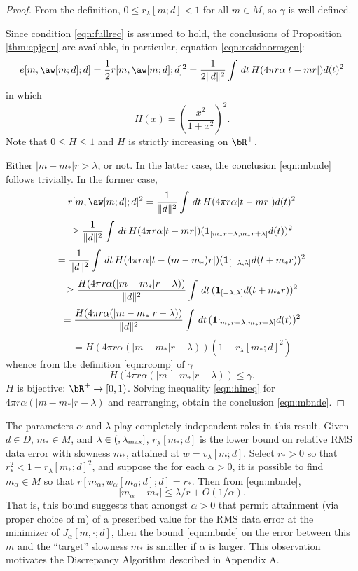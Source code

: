 \begin{proof}
From the definition, $0 \le r_{\lambda}[m;d] < 1 $ for all $m \in M$, so $\gamma$ is well-defined.

Since condition \ref{eqn:fullrec} is assumed to hold, the conclusions of Proposition \ref{thm:epjgen} are available, in particular, equation \ref{eqn:residnormgen}:
  \[
  e[m,\aw[m;d];d] = \frac{1}{2}r[m,\aw[m;d];d]^2 = \frac{1}{2\|d\|^2} \int\, dt\, H(4\pi r\alpha|t-mr|)d(t)^2
  \]
  in which 
  \[
  H(x) = \left( \frac{x^2}{1+x^2}\right)^2.
  \]
  Note that $0 \le H \le 1$ and $H$ is strictly increasing on $\bR^+$. 
  
  Either $|m-m_*|r > \lambda$, or not. In the latter case, the conclusion \ref{eqn:mbnde} follows trivially. In the former case,
  \[
  r[m,\aw[m;d];d]^2 = \frac{1}{\|d\|^2} \int\, dt\, H(4\pi r\alpha|t-mr|)d(t)^2
  \]
  \[
  \ge \frac{1}{\|d\|^2} \int\, dt\, H(4\pi r\alpha|t-mr|)({\bf 1}_{[m_*r-\lambda,m_*r+\lambda]}d(t))^2
  \]
  \[
  = \frac{1}{\|d\|^2} \int\, dt\, H(4\pi r\alpha|t-(m-m_*)r|)({\bf 1}_{[-\lambda,\lambda]}d(t+m_*r))^2
  \]
  \[
  \ge \frac{H(4\pi r\alpha(|m-m_*|r-\lambda))}{\|d\|^2} \int\, dt\, ({\bf 1}_{[-\lambda,\lambda]}d(t+m_*r))^2
  \]
  \[
   = \frac{H(4\pi r\alpha(|m-m_*|r-\lambda))}{\|d\|^2} \int\, dt\, ({\bf 1}_{[m_*r-\lambda,m_*r+\lambda]}d(t))^2
  \]
  \[
  = H(4\pi r\alpha(|m-m_*|r-\lambda))(1 - r_{\lambda}[m_*;d]^2)
  \]
  whence from the definition \ref{eqn:rcomp} of $\gamma$
  \begin{equation}
      \label{eqn:hineq}
    H(4\pi r\alpha(|m-m_*|r-\lambda)) \le \gamma.
  \end{equation}
$H$ is bijective: $\bR^+ \rightarrow [0,1)$. Solving inequality \ref{eqn:hineq} for $4 \pi r \alpha(|m-m_*|r-\lambda)$ and rearranging, obtain the conclusion \ref{eqn:mbnde}. 
\end{proof}

 The parameters $\alpha$ and $\lambda$ play completely independent roles in this result. Given $d \in D$, $m_* \in M$, and $\lambda \in (,\lambda_{\rm max}]$, $r_{\lambda}[m_*;d]$ is the lower bound on relative RMS data error with slowness $m_*$, attained at $w = v_{\lambda}[m;d]$. Select $r_*>0$ so that $r_*^2 < 1 - r_{\lambda}[m_*;d]^2$, and suppose the for each $\alpha>0$, it is possible to find $m_{\alpha} \in M$ so that $r[m_{\alpha},w_{\alpha}[m_{\alpha};d];d] = r_*$. Then from \ref{eqn:mbnde},
\[
|m_{\alpha}-m_*| \le \lambda/r + O(1/\alpha).
\]
That is, this bound suggests that amongst $\alpha>0$ that permit attainment (via proper choice of m) of a prescribed value for the RMS data error at the minimizer of $J_{\alpha}[m,\cdot;d]$, then the bound \ref{eqn:mbnde} on the error between this $m$ and the ``target'' slowness $m_*$ is smaller if $\alpha$ is larger. This observation motivates the Discrepancy Algorithm described in Appendix A. 

